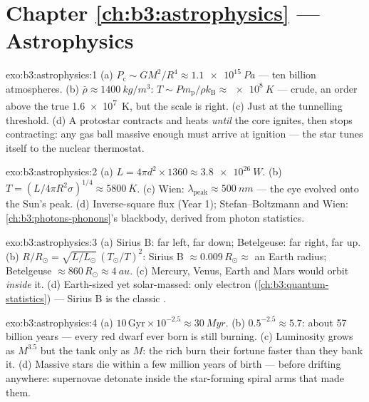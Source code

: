 \section*{Chapter \ref{ch:b3:astrophysics} --- Astrophysics}

\begin{solution}{exo:b3:astrophysics:1}
(a) $P_{\text{c}} \sim GM^2/R^4 \approx \qty{1.1e15}{Pa}$ --- ten
billion atmospheres. (b) $\bar\rho \approx \qty{1400}{kg/m^3}$:
$T \sim P m_{\text{p}}/\rho k_{\text{B}} \approx \qty{e8}{K}$ ---
crude, an order above the true \qty{1.6e7}{K}, but the scale is
right. (c) Just at the tunnelling threshold. (d) A protostar
contracts and heats \emph{until} the core ignites, then stops
contracting: any gas ball massive enough must arrive at ignition
--- the star tunes itself to the nuclear thermostat.
\end{solution}

\begin{solution}{exo:b3:astrophysics:2}
(a) $L = 4\pi d^2\times1360 \approx \qty{3.8e26}{W}$. (b) $T =
(L/4\pi R^2\sigma)^{1/4} \approx \qty{5800}{K}$. (c) Wien:
$\lambda_{\text{peak}} \approx \qty{500}{nm}$ --- the eye evolved
onto the Sun's peak. (d) Inverse-square flux (Year 1);
Stefan--Boltzmann and Wien: \cref{ch:b3:photons-phonons}'s
blackbody, derived from photon statistics.
\end{solution}

\begin{solution}{exo:b3:astrophysics:3}
(a) Sirius B: far left, far down; Betelgeuse: far right, far up.
(b) $R/R_\odot = \sqrt{L/L_\odot}\,(T_\odot/T)^2$: Sirius B
$\approx 0.009\,R_\odot \approx$ an Earth radius; Betelgeuse
$\approx 860\,R_\odot \approx \qty{4}{au}$. (c) Mercury, Venus,
Earth and Mars would orbit \emph{inside} it. (d) Earth-sized yet
solar-massed: only electron 
(\cref{ch:b3:quantum-statistics}) --- Sirius B is the classic
.
\end{solution}

\begin{solution}{exo:b3:astrophysics:4}
(a) $10\,\text{Gyr}\times10^{-2.5} \approx \qty{30}{Myr}$. (b)
$0.5^{-2.5} \approx 5.7$: about 57 billion years --- every red
dwarf ever born is still burning. (c) Luminosity grows as
$M^{3.5}$ but the tank only as $M$: the rich burn their fortune
faster than they bank it. (d) Massive stars die within a few
million years of birth --- before drifting anywhere: supernovae
detonate inside the star-forming spiral arms that made them.
\end{solution}

